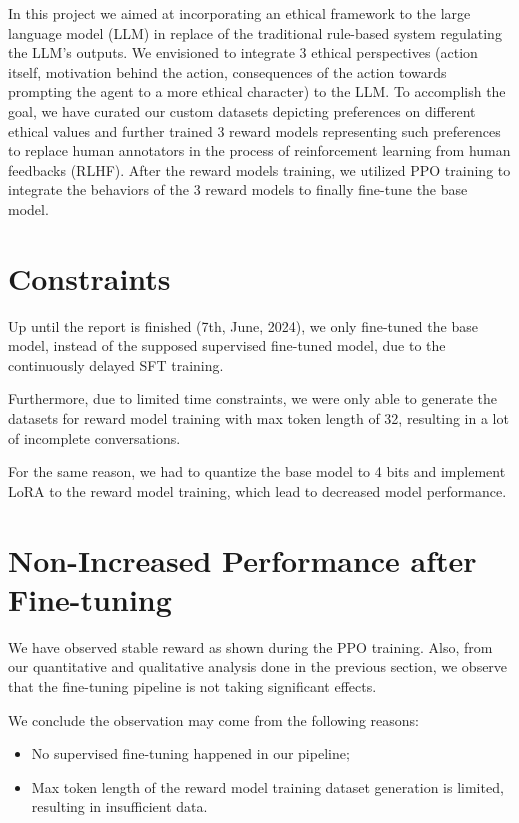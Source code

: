 In this project we aimed at incorporating an ethical framework to the large language model (LLM) in replace of the traditional rule-based system regulating the LLM's outputs. We envisioned to integrate 3 ethical perspectives (action itself, motivation behind the action, consequences of the action towards prompting the agent to a more ethical character) to the LLM. To accomplish the goal,
we have curated our custom datasets depicting preferences on different ethical values and further trained 3 reward models representing such preferences to replace human annotators in the process of reinforcement learning from human feedbacks (RLHF). After the reward models training, we utilized PPO training to integrate the behaviors of the 3 reward models to finally fine-tune the base model.

\section{Constraints}
Up until the report is finished (7th, June, 2024), we only fine-tuned the base model, instead of the supposed supervised fine-tuned model, due to the continuously delayed SFT training.


Furthermore, due to limited time constraints, we were only able to generate the datasets for reward model training with max token length of 32, resulting in a lot of incomplete conversations. 

For the same reason, we had to quantize the base model to 4 bits and implement LoRA to the reward model training, which lead to decreased model performance. 

\section{Non-Increased Performance after Fine-tuning}
We have observed stable reward as shown during the PPO training. Also, from our quantitative and qualitative analysis done in the previous section, we observe that the fine-tuning pipeline is not taking significant effects.

We conclude the observation may come from the following reasons:
\begin{itemize}
    \item No supervised fine-tuning happened in our pipeline;
    \item Max token length of the reward model training dataset generation is limited, resulting in insufficient data.
\end{itemize}


